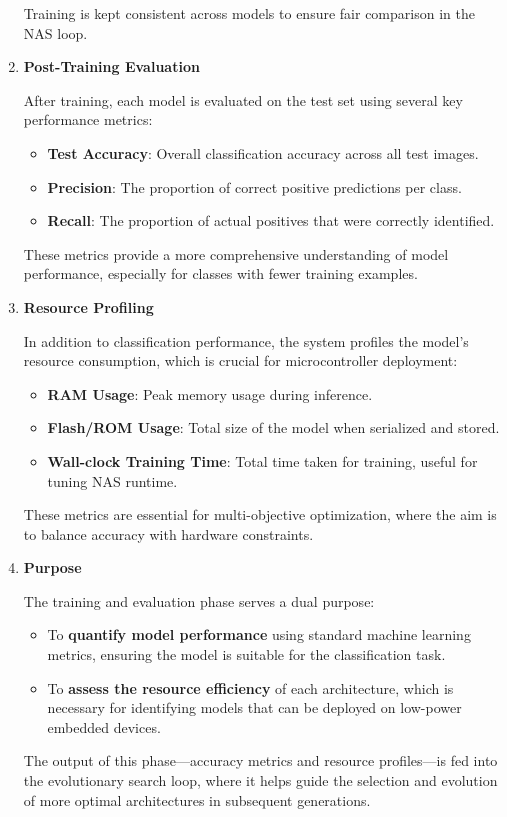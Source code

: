 \begin{enumerate}
Training is kept consistent across models to ensure fair comparison in the NAS loop.
\item \textbf{Post-Training Evaluation}

After training, each model is evaluated on the test set using several key performance metrics: 
\begin{itemize}
    \item \textbf{Test Accuracy}: Overall classification accuracy across all test images.
    \item \textbf{Precision}: The proportion of correct positive predictions per class.
    \item \textbf{Recall}: The proportion of actual positives that were correctly identified.
\end{itemize}

These metrics provide a more comprehensive understanding of model performance, especially for classes with fewer training examples.

\item \textbf{Resource Profiling}

In addition to classification performance, the system profiles the model’s resource consumption, which is crucial for microcontroller deployment:
\begin{itemize}
    \item \textbf{RAM Usage}: Peak memory usage during inference.
    \item \textbf{Flash/ROM Usage}: Total size of the model when serialized and stored.
    \item \textbf{Wall-clock Training Time}: Total time taken for training, useful for tuning NAS runtime.
\end{itemize}

These metrics are essential for multi-objective optimization, where the aim is to balance accuracy with hardware constraints.
\item \textbf{Purpose}

The training and evaluation phase serves a dual purpose:
\begin{itemize}
    \item To \textbf{quantify model performance} using standard machine learning metrics, ensuring the model is suitable for the classification task.
    \item To\textbf{ assess the resource efficiency }of each architecture, which is necessary for identifying models that can be deployed on low-power embedded devices.
\end{itemize}

The output of this phase—accuracy metrics and resource profiles—is fed into the evolutionary search loop, where it helps guide the selection and evolution of more optimal architectures in subsequent generations.


    
\end{enumerate}


